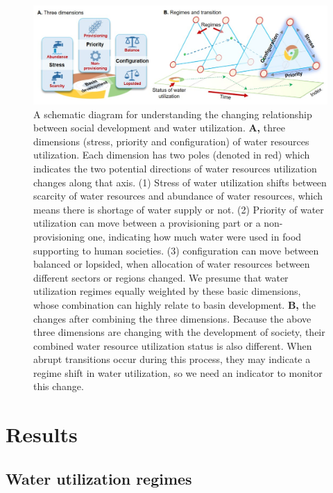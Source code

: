 \documentclass[9pt, twocolumn, twoside, lineno]{pnas-new}
\begin{document}
\begin{figure}%
	\centering
	\includegraphics[width=0.8\linewidth]{../../figures/main/framework.jpg}
	\caption{
		A schematic diagram for understanding the changing relationship between social development and water utilization.
		\textbf{A,} three dimensions (stress, priority and configuration) of water resources utilization. Each dimension has two poles (denoted in red) which indicates the two potential directions of water resources utilization changes along that axis. (1) Stress of water utilization shifts between scarcity of water resources and abundance of water resources, which means there is shortage of water supply or not. (2) Priority of water utilization can move between a provisioning part or a non-provisioning one, indicating how much water were used in food supporting to human societies. (3) configuration can move between balanced or lopsided, when allocation of water resources between different sectors or regions changed. We presume that water utilization regimes equally weighted by these basic dimensions, whose combination can highly relate to basin development. 
		\textbf{B,} the changes after combining the three dimensions. Because the above three dimensions are changing with the development of society, their combined water resource utilization status is also different. When abrupt transitions occur during this process, they may indicate a regime shift in water utilization, so we need an indicator to monitor this change.
	}
	\label{fig:framework}
\end{figure}


\section*{Results}
\subsection*{Water utilization regimes}
\end{document}

